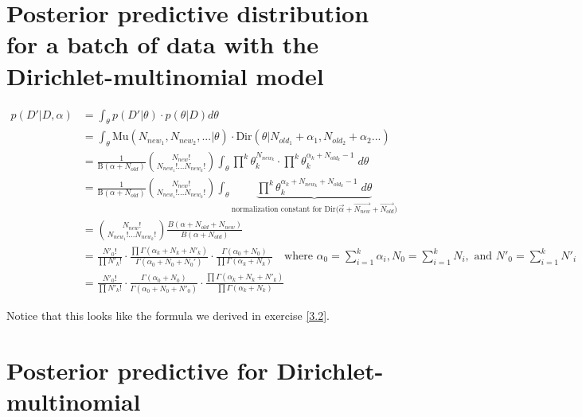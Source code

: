 \documentclass{article}
\begin{document}
\section{Posterior predictive distribution for a batch of data with
the Dirichlet-multinomial model}
\label{3.13}

\begin{align*}
  p(D'|D,\alpha) &= \int_\theta p(D'|\theta) \cdot p(\theta|D) d\theta
  \\
                 &= \int_\theta \text{Mu}(N_{new_1}, N_{new_2},...|\theta) \cdot
                   \text{Dir}(\theta|N_{old_1} + \alpha_1, N_{old_2} + \alpha_2 ...)
  \\
                 &= \frac{1}{\text{B}(\alpha + N_{old})} {N_{new}!
                   \choose N_{new_1}! ... N_{new_k}!} \int_{\theta}
                   \prod^k \theta_k^{N_{new_k}} \cdot \prod^k
                   \theta_k^{\alpha_k + N_{old_k}
                   - 1} \; d\theta \\
                 &= \frac{1}{\text{B}(\alpha + N_{old})} {N_{new}!
                   \choose N_{new_1}! ... N_{new_k}!} \int_{\theta} \underbrace{
                   \prod^k \theta_k^{\alpha_k + N_{new_k} + N_{old_k}
                   - 1} \; d\theta}_{\text{normalization constant for
                   Dir($\vec{\alpha} + \vec{N_{new}} +
                   \vec{N_{old}}$)}} \\
                 &= {N_{new}! \choose N_{new_1}! ... N_{new_k}!}
                   \frac{B(\alpha + N_{old} + N_{new})}{B(\alpha +
                   N_{old})} \\
                 &= \frac{N'_0!}{\prod N'_k!} \cdot \frac{\prod
                   \Gamma(\alpha_k + N_k + N'_k)}{\Gamma(\alpha_0 + N_0
                   + N_0')} \cdot \frac{\Gamma(\alpha_0 + N_0)}{\prod
                   \Gamma(\alpha_k + N_k)} \quad \text{where
                   $\alpha_0 = \sum_{i=1}^k \alpha_i, N_0 = \sum_{i=1}^k
                   N_i, \text{ and } N'_0 = \sum_{i=1}^k N'_i$} \\
                 &= \frac{N'_0!}{\prod N'_k!} \cdot \frac{\Gamma(\alpha_0 +
                   N_0)}{\Gamma(\alpha_0 + N_0 + N'_0)} \cdot
                   \frac{\prod \Gamma(\alpha_k + N_k + N'_k)}{\prod
                   \Gamma(\alpha_k + N_k)}
\end{align*}

Notice that this looks like the formula we derived in exercise
\ref{3.2}.

\section{Posterior predictive for Dirichlet-multinomial}
\end{document}
